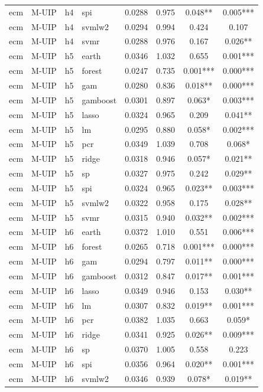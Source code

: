 \begin{ThreePartTable}
\begin{longtable}[t]{llclcccc}
ecm & M-UIP & h4 & spi & 0.0288 & 0.975 & 0.048** & 0.005***\\
ecm & M-UIP & h4 & svmlw2 & 0.0294 & 0.994 & 0.424 & 0.107\\
ecm & M-UIP & h4 & svmr & 0.0288 & 0.976 & 0.167 & 0.026**\\
\addlinespace
ecm & M-UIP & h5 & earth & 0.0346 & 1.032 & 0.655 & 0.001***\\
ecm & M-UIP & h5 & forest & 0.0247 & 0.735 & 0.001*** & 0.000***\\
ecm & M-UIP & h5 & gam & 0.0280 & 0.836 & 0.018** & 0.000***\\
ecm & M-UIP & h5 & gamboost & 0.0301 & 0.897 & 0.063* & 0.003***\\
ecm & M-UIP & h5 & lasso & 0.0324 & 0.965 & 0.209 & 0.041**\\
ecm & M-UIP & h5 & lm & 0.0295 & 0.880 & 0.058* & 0.002***\\
ecm & M-UIP & h5 & pcr & 0.0349 & 1.039 & 0.708 & 0.068*\\
ecm & M-UIP & h5 & ridge & 0.0318 & 0.946 & 0.057* & 0.021**\\
ecm & M-UIP & h5 & sp & 0.0327 & 0.975 & 0.242 & 0.029**\\
ecm & M-UIP & h5 & spi & 0.0324 & 0.965 & 0.023** & 0.003***\\
ecm & M-UIP & h5 & svmlw2 & 0.0322 & 0.958 & 0.175 & 0.028**\\
ecm & M-UIP & h5 & svmr & 0.0315 & 0.940 & 0.032** & 0.002***\\
\addlinespace
ecm & M-UIP & h6 & earth & 0.0372 & 1.010 & 0.551 & 0.006***\\
ecm & M-UIP & h6 & forest & 0.0265 & 0.718 & 0.001*** & 0.000***\\
ecm & M-UIP & h6 & gam & 0.0294 & 0.797 & 0.011** & 0.000***\\
ecm & M-UIP & h6 & gamboost & 0.0312 & 0.847 & 0.017** & 0.001***\\
ecm & M-UIP & h6 & lasso & 0.0349 & 0.946 & 0.153 & 0.030**\\
ecm & M-UIP & h6 & lm & 0.0307 & 0.832 & 0.019** & 0.001***\\
ecm & M-UIP & h6 & pcr & 0.0382 & 1.035 & 0.663 & 0.059*\\
ecm & M-UIP & h6 & ridge & 0.0341 & 0.925 & 0.026** & 0.009***\\
ecm & M-UIP & h6 & sp & 0.0370 & 1.005 & 0.558 & 0.223\\
ecm & M-UIP & h6 & spi & 0.0356 & 0.964 & 0.020** & 0.001***\\
ecm & M-UIP & h6 & svmlw2 & 0.0346 & 0.939 & 0.078* & 0.019**\\

\end{longtable}
\end{ThreePartTable}
